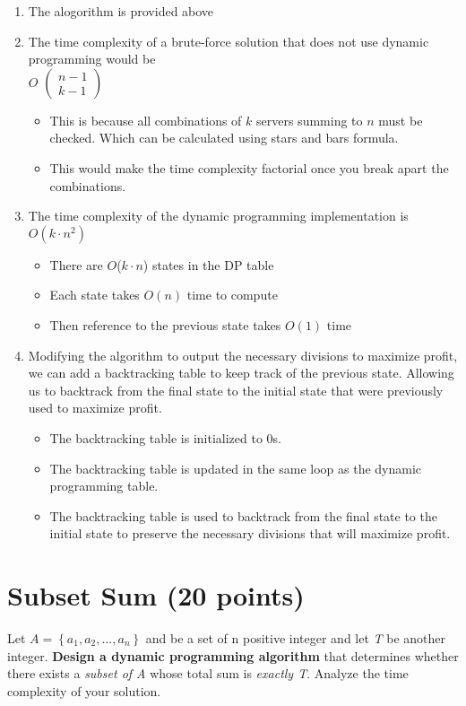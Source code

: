 \documentclass{article}[12pt]
\begin{document}
\pagebreak

\begin{enumerate}
  \item The alogorithm is provided above
  \item The time complexity of a brute-force solution that does not use dynamic programming
    would be\\
    $O$
    $\begin{pmatrix}
      n-1 \\
      k-1 \end{pmatrix}$

    \begin{itemize}
      \item This is because all combinations of $k$ servers summing to $n$ must be checked.
        Which can be calculated using stars and bars formula.
      \item This would make the time complexity factorial once you break apart the combinations.
    \end{itemize}
  \item The time complexity of the dynamic programming implementation is $O(k\cdot n^{2})$
    \begin{itemize}
      \item There are $O$($k \cdot n$) states in the DP table
      \item Each state takes $O(n)$ time to compute
      \item Then reference to the previous state takes $O(1)$ time
    \end{itemize}
  \item Modifying the algorithm to output the necessary divisions to maximize profit,
    we can add a backtracking table to keep track of the previous state.
    Allowing us to backtrack from the final state to the initial state
    that were previously used to maximize profit.
    \begin{itemize}
      \item The backtracking table is initialized to 0s.
      \item The backtracking table is updated in the same loop as the dynamic programming table.
      \item The backtracking table is used to backtrack from the
        final state to the initial state to preserve the necessary divisions that will maximize profit.
    \end{itemize}
\end{enumerate}

\pagebreak
\section{Subset Sum (20 points)  }
Let $A = \left\{a_1 , a_2 ,. . . , a_n \right\}$ and be a set of n positive integer and let \textit{T} be another integer. \textbf{Design a dynamic programming algorithm} that determines whether there exists a \textit{subset of A} whose total sum is \textit{exactly T}. Analyze the time complexity
of your solution.
\end{document}
